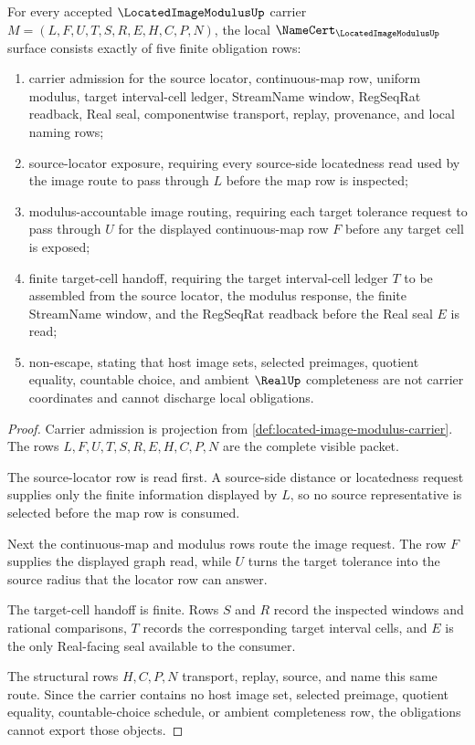 \begin{theorem}
\label{thm:located-image-modulus-namecert-obligations}
For every accepted $\LocatedImageModulusUp$ carrier $M=(L,F,U,T,S,R,E,H,C,P,N)$, the local $\NameCert_{\LocatedImageModulusUp}$ surface consists exactly of five finite obligation rows:
\begin{enumerate}
\item carrier admission for the source locator, continuous-map row, uniform modulus, target interval-cell ledger, StreamName window, RegSeqRat readback, Real seal, componentwise transport, replay, provenance, and local naming rows;
\item source-locator exposure, requiring every source-side locatedness read used by the image route to pass through $L$ before the map row is inspected;
\item modulus-accountable image routing, requiring each target tolerance request to pass through $U$ for the displayed continuous-map row $F$ before any target cell is exposed;
\item finite target-cell handoff, requiring the target interval-cell ledger $T$ to be assembled from the source locator, the modulus response, the finite StreamName window, and the RegSeqRat readback before the Real seal $E$ is read;
\item non-escape, stating that host image sets, selected preimages, quotient equality, countable choice, and ambient $\RealUp$ completeness are not carrier coordinates and cannot discharge local obligations.
\end{enumerate}
\end{theorem}
\begin{proof}
Carrier admission is projection from \autoref{def:located-image-modulus-carrier}. The rows $L,F,U,T,S,R,E,H,C,P,N$ are the complete visible packet.

The source-locator row is read first. A source-side distance or locatedness request supplies only the finite information displayed by $L$, so no source representative is selected before the map row is consumed.

Next the continuous-map and modulus rows route the image request. The row $F$ supplies the displayed graph read, while $U$ turns the target tolerance into the source radius that the locator row can answer.

The target-cell handoff is finite. Rows $S$ and $R$ record the inspected windows and rational comparisons, $T$ records the corresponding target interval cells, and $E$ is the only Real-facing seal available to the consumer.

The structural rows $H,C,P,N$ transport, replay, source, and name this same route. Since the carrier contains no host image set, selected preimage, quotient equality, countable-choice schedule, or ambient completeness row, the obligations cannot export those objects.
\end{proof}

